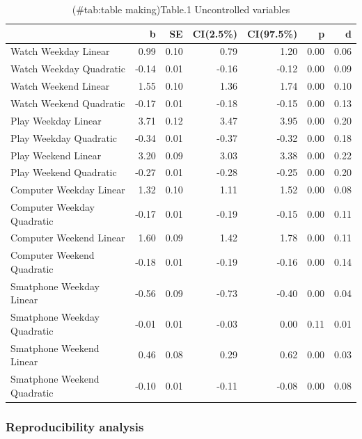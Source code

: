 \documentclass[man]{apa6}
\theoremstyle{definition}
\theoremstyle{definition}
\theoremstyle{definition}
\theoremstyle{remark}
\begin{document}
\begin{table}

\caption{(\#tab:table making)Table.1 Uncontrolled variables}
\centering
\begin{tabular}[t]{l|r|r|r|r|r|r}
\hline
  & b & SE & CI(2.5\%) & CI(97.5\%) & p & d\\
\hline
Watch Weekday Linear & 0.99 & 0.10 & 0.79 & 1.20 & 0.00 & 0.06\\
\hline
Watch Weekday Quadratic & -0.14 & 0.01 & -0.16 & -0.12 & 0.00 & 0.09\\
\hline
Watch Weekend Linear & 1.55 & 0.10 & 1.36 & 1.74 & 0.00 & 0.10\\
\hline
Watch Weekend Quadratic & -0.17 & 0.01 & -0.18 & -0.15 & 0.00 & 0.13\\
\hline
Play Weekday Linear & 3.71 & 0.12 & 3.47 & 3.95 & 0.00 & 0.20\\
\hline
Play Weekday Quadratic & -0.34 & 0.01 & -0.37 & -0.32 & 0.00 & 0.18\\
\hline
Play Weekend Linear & 3.20 & 0.09 & 3.03 & 3.38 & 0.00 & 0.22\\
\hline
Play Weekend Quadratic & -0.27 & 0.01 & -0.28 & -0.25 & 0.00 & 0.20\\
\hline
Computer Weekday Linear & 1.32 & 0.10 & 1.11 & 1.52 & 0.00 & 0.08\\
\hline
Computer Weekday Quadratic & -0.17 & 0.01 & -0.19 & -0.15 & 0.00 & 0.11\\
\hline
Computer Weekend Linear & 1.60 & 0.09 & 1.42 & 1.78 & 0.00 & 0.11\\
\hline
Computer Weekend Quadratic & -0.18 & 0.01 & -0.19 & -0.16 & 0.00 & 0.14\\
\hline
Smatphone Weekday Linear & -0.56 & 0.09 & -0.73 & -0.40 & 0.00 & 0.04\\
\hline
Smatphone Weekday Quadratic & -0.01 & 0.01 & -0.03 & 0.00 & 0.11 & 0.01\\
\hline
Smatphone Weekend Linear & 0.46 & 0.08 & 0.29 & 0.62 & 0.00 & 0.03\\
\hline
Smatphone Weekend Quadratic & -0.10 & 0.01 & -0.11 & -0.08 & 0.00 & 0.08\\
\hline
\end{tabular}
\end{table}

\hypertarget{reproducibility-analysis}{%
\subsubsection{Reproducibility
analysis}\label{reproducibility-analysis}}
\end{document}
